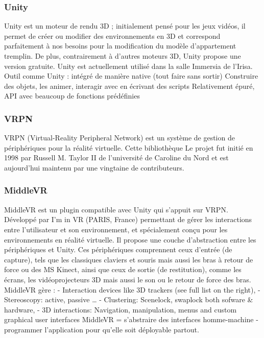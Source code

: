	\subsubsection{Unity} 
		Unity est un moteur de rendu 3D ; initialement pensé pour les jeux vidéos, il permet de créer ou modifier des environnements en 3D et correspond parfaitement à nos besoins pour la modification du modèle d’appartement tremplin. De plus, contrairement à d’autres moteurs 3D, Unity propose une version gratuite. Unity est actuellement utilisé dans la salle Immersia de l’Irisa.      
		Outil comme Unity : intégré de manière native (tout faire sans sortir)
		Construire des objets, les animer, interagir avec en écrivant des scripts
		Relativement épuré, API avec beaucoup de fonctions prédéfinies


	\subsubsection{VRPN}
		VRPN (Virtual-Reality Peripheral Network) est un système de gestion de périphériques pour la réalité virtuelle. Cette bibliothèque
		Le projet fut initié en 1998 par Russell M. Taylor II de l'université de Caroline du Nord et est aujourd'hui maintenu par une vingtaine de contributeurs.
	
	\subsubsection{MiddleVR}
		MiddleVR est un plugin compatible avec Unity qui s'appuit sur  VRPN. Développé par I’m in VR (PARIS, France) permettant de gérer les interactions entre l’utilisateur et son environnement, et spécialement conçu pour les environnements en réalité virtuelle. 
		Il propose une couche d’abstraction entre les périphériques et Unity. Ces périphériques comprennent ceux d’entrée (de capture), tels que les classiques claviers et souris mais aussi les bras à retour de force ou des MS Kinect, ainsi que ceux de sortie (de restitution), comme les écrans, les vidéoprojecteurs 3D mais aussi le son ou le retour de force des bras. 
		MiddleVR gère :
		- Interaction devices like 3D trackers (see full list on the right),
		- Stereoscopy: active, passive …
		- Clustering: Scenelock, swaplock both sofware \& hardware,
		- 3D interactions: Navigation, manipulation, menus and custom graphical user interfaces
		MiddleVR = s'abstraire des interfaces homme-machine - programmer l'application pour qu'elle soit déployable partout.


